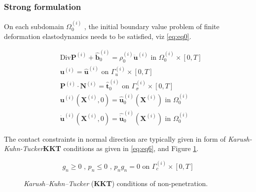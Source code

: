 \documentclass[a4paper,10pt]{article} %
\begin{document}
\subsubsection{Strong formulation}\label{section:stronfrictionless}

On each subdomain $\Omega_0^{(i)}$ , the initial boundary value problem of finite deformation elastodynamics needs to be satisfied, viz \eqref{eq:eq0}.

\begin{subequations}\label{eq:eq0}
\begin{align}
 & \text{Div} \mathbf{P}^{(i)}+\hat{\mathbf{b}}_0^{(i)}=\rho_0^{(i)}\ddot{\mathbf{u}}^{(i)} \text{ in } \Omega_0^{(i)} \times [0, T] \label{eq:subeq1}\\
 & \mathbf{u}^{(i)} = \hat{\mathbf{u}}^{(i)} \text{ on } \Gamma_u^{(i)} \times [0, T] \label{eq:subeq2}\\
 & \mathbf{P}^{(i)} \cdot \mathbf{N}^{(i)} = \hat{\mathbf{t}}_0^{(i)} \text{ on } \Gamma_\sigma^{(i)} \times [0, T] \label{eq:subeq3} \\
 & \mathbf{u}^{(i)}\left( \mathbf{X}^{(i)}, 0\right) = \hat{\mathbf{u}}_0^{(i)}\left( \mathbf{X}^{(i)}\right) \text{ in } \Omega_0^{(i)} \label{eq:subeq4} \\
 & \dot{\mathbf{u}}^{(i)}\left( \mathbf{X}^{(i)}, 0\right) = \hat{\dot{\mathbf{u}}}_0^{(i)}\left( \mathbf{X}^{(i)}\right) \text{ in } \Omega_0^{(i)} \label{eq:subeq5}
 \end{align}
\end{subequations}

The contact constraints in normal direction are typically given in form of \textit{Karush-Kuhn-Tucker}\textbf{KKT} conditions as given in \eqref{eq:eq6}, and Figure \ref{fig:kkt}.

 \begin{equation}\label{eq:eq6}
g_n \geq 0 \text{ , } p_n \leq 0 \text{ , } p_n g_n = 0 \text{ on } \Gamma_c^{(i)} \times [0, T]
 \end{equation}

\begin{figure}[h]
\begin{center}
\caption{\textit{Karush–Kuhn–Tucker} (\textbf{KKT}) conditions of non-penetration.}
\label{fig:kkt}
\end{center}
\end{figure}
\end{document}
